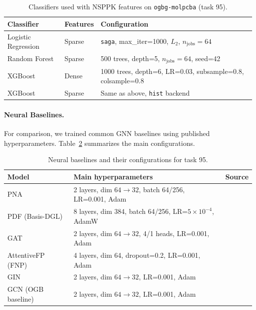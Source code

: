 \begin{table}[H]
\centering
\caption{Classifiers used with NSPPK features on \texttt{ogbg-molpcba} (task 95).}
\label{tab:nsppk-classifiers}
\begin{tabular}{l l p{7cm}}
\toprule
Classifier & Features & Configuration \\
\midrule
Logistic Regression & Sparse & \texttt{saga}, max\_iter=1000, $L_2$, $n_{\text{jobs}}=64$ \\
Random Forest & Sparse & 500 trees, depth=5, $n_{\text{jobs}}=64$, seed=42 \\
XGBoost & Dense & 1000 trees, depth=6, LR=0.03, subsample=0.8, colsample=0.8 \\
XGBoost & Sparse & Same as above, \texttt{hist} backend \\
\bottomrule
\end{tabular}
\end{table}

\paragraph{Neural Baselines.}
For comparison, we trained common GNN baselines using published
hyperparameters. Table~\ref{tab:nn-baselines} summarizes the main
configurations.

\begin{table}[H]
\centering
\caption{Neural baselines and their configurations for task 95.}
\label{tab:nn-baselines}
\begin{tabular}{l p{7cm} l}
\toprule
Model & Main hyperparameters & Source \\
\midrule
PNA & 2 layers, dim $64\rightarrow32$, batch 64/256, LR=0.001, Adam & \cite{corso2020pna} \\
PDF (Basis-DGL) & 8 layers, dim 384, batch 64/256, LR=$5\times10^{-4}$, AdamW & \cite{yang2023pdf} \\
GAT & 2 layers, dim $64\rightarrow32$, 4/1 heads, LR=0.001, Adam & \cite{velivckovic2018gat} \\
AttentiveFP (FNP) & 4 layers, dim 64, dropout=0.2, LR=0.001, Adam & \cite{xiong2019attentivefp} \\
GIN & 2 layers, dim $64\rightarrow32$, LR=0.001, Adam & \cite{xu2019powerful} \\
GCN (OGB baseline) & 2 layers, dim $64\rightarrow32$, LR=0.001, Adam & \cite{hu2020ogb} \\
\bottomrule
\end{tabular}
\end{table}

